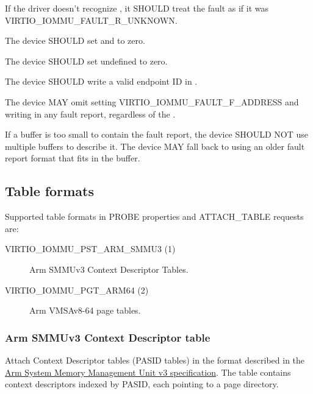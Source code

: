 If the driver doesn't recognize , it SHOULD treat the fault
as if it was VIRTIO_IOMMU_FAULT_R_UNKNOWN.


The device SHOULD set  and  to zero.

The device SHOULD set undefined  to zero.

The device SHOULD write a valid endpoint ID in .

The device MAY omit setting VIRTIO_IOMMU_FAULT_F_ADDRESS and writing
 in any fault report, regardless of the .

If a buffer is too small to contain the fault report\footnotemark, the
device SHOULD NOT use multiple buffers to describe it. The device MAY fall
back to using an older fault report format that fits in the buffer.


\subsection{Table formats}\label{sec:Device Types / IOMMU Device / Table Formats}

Supported table formats in PROBE properties and ATTACH_TABLE
requests are:
\begin{description}
  \item[VIRTIO_IOMMU_PST_ARM_SMMU3 (1)] Arm SMMUv3 Context
    Descriptor Tables.
  \item[VIRTIO_IOMMU_PGT_ARM64 (2)] Arm VMSAv8-64 page tables.
\end{description}

\subsubsection{Arm SMMUv3 Context Descriptor table}\label{sec:Device Types / IOMMU Device / Table Formats / Arm SMMUv3 Context Descriptor}

Attach Context Descriptor tables (PASID tables) in the format
described in the \hyperref[intro:SMMUv3]{Arm System Memory
Management Unit v3 specification}. The table contains context
descriptors indexed by PASID, each pointing to a page directory.

